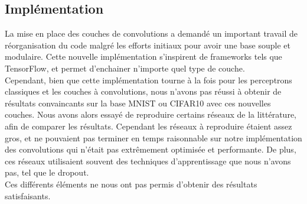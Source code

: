 \subsection{Implémentation}
La mise en place des couches de convolutions a demandé un important travail de réorganisation du code malgré les efforts initiaux pour avoir une base souple et modulaire.
Cette nouvelle implémentation s'inspirent de frameworks tels que TensorFlow, et permet d'enchainer n'importe quel type de couche.
\\
Cependant, bien que cette implémentation tourne à la fois pour les perceptrons classiques et les couches à convolutions, nous n'avons pas réussi à obtenir de résultats convaincants sur la base MNIST ou CIFAR10 avec ces nouvelles couches.
Nous avons alors essayé de reproduire certains réseaux de la littérature, afin de comparer les résultats.
Cependant les réseaux à reproduire étaient assez gros, et ne pouvaient pas terminer en temps raisonnable sur notre implémentation des convolutions qui n'était pas extrêmement optimisée et performante.
De plus, ces réseaux utilisaient souvent des techniques d'apprentissage que nous n'avons pas, tel que le dropout.
\\
Ces différents éléments ne nous ont pas permis d'obtenir des résultats satisfaisants.
 

